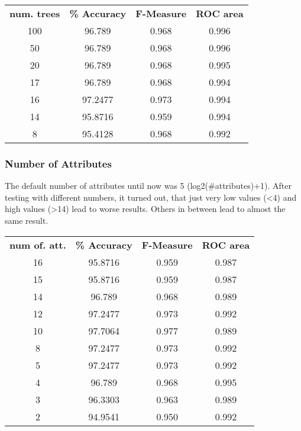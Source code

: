 \documentclass{sig-alternate-05-2015}
\begin{document}
{\begin{center}
\begin{tabular}{ c | c | c | c }
\textbf{num. trees} & \textbf{\% Accuracy} & \textbf{F-Measure} & \textbf{ROC area} \\
100 & 96.789 & 0.968 & 0.996 \\
50 & 96.789 & 0.968 &  0.996 \\
20 & 96.789 & 0.968 & 0.995 \\
17 & 96.789 & 0.968 & 0.994 \\
16 & 97.2477 & 0.973 & 0.994 \\
14 & 95.8716 & 0.959 & 0.994 \\
8 & 95.4128 & 0.968 & 0.992 \\
\end{tabular}
\end{center}
 
\subsubsection{Number of Attributes}
 
The default number of attributes until now was 5 (log2(\#attributes)+1). After testing with different numbers, it turned out, that just very low values (\textless4) and high values (\textgreater14) lead to worse results. Others in between lead to almost the same result.
 
\begin{center}
\begin{tabular}{ c | c | c | c }
\textbf{num of. att.} & \textbf{\% Accuracy} & \textbf{F-Measure} & \textbf{ROC area}\\
16 & 95.8716 & 0.959 & 0.987  \\
15 & 95.8716 & 0.959 & 0.987 \\
14 & 96.789 &  0.968 & 0.989 \\
12 & 97.2477 & 0.973 & 0.992 \\
10 & 97.7064 & 0.977 & 0.989 \\
8 & 97.2477 & 0.973 & 0.992 \\
5 & 97.2477 & 0.973 & 0.992 \\
4 & 96.789 & 0.968 & 0.995 \\
3 & 96.3303 & 0.963 & 0.989 \\
2 & 94.9541 & 0.950 & 0.992 \\
\end{tabular}
\end{center} 

}
\end{document}
